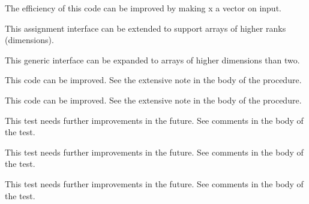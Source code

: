 \begin{DoxyRefList}
%
 The efficiency of this code can be improved by making {\ttfamily x} a vector on input. 
\item[(=) Type \mbox{\hyperlink{interfaceString__mod_1_1assignment_07_0a_08}{String\+\_\+mod\+::assignment(=)}} ]\label{todo__todo000058}%
%
 This assignment interface can be extended to support arrays of higher ranks (dimensions). 
\item[Type \mbox{\hyperlink{interfaceString__mod_1_1val2char}{String\+\_\+mod\+::val2char}} ]\label{todo__todo000057}%
%
 This generic interface can be expanded to arrays of higher dimensions than two. 
\item[Subprogram \mbox{\hyperlink{namespaceSystem__mod_a8f999de90840ba33f9cf7f30edd41b3d}{System\+\_\+mod\+::copy\+File}} (path\+Old, path\+New, is\+Unix\+Shell, Err)]\label{todo__todo000060}%
%
 This code can be improved. See the extensive note in the body of the procedure.  
\item[Subprogram \mbox{\hyperlink{namespaceSystem__mod_acdbe0231b40135bc08ab285fc69f2b80}{System\+\_\+mod\+::get\+System\+Info}} (List, Err, OS, count, cache\+File)]\label{todo__todo000059}%
%
 This code can be improved. See the extensive note in the body of the procedure.  
\item[Subprogram \mbox{\hyperlink{namespaceTest__System__mod_a56a58918b2888e7ea0fa691de93cdeb3}{Test\+\_\+\+System\+\_\+mod\+::test\+\_\+\+Cmd\+Arg\+\_\+type\+\_\+1}} ()]\label{todo__todo000067}%
%
 This test needs further improvements in the future. See comments in the body of the test.  
\item[Subprogram \mbox{\hyperlink{namespaceTest__System__mod_a43fd8159ffe52170057e95d4e0c38d63}{Test\+\_\+\+System\+\_\+mod\+::test\+\_\+\+Env\+Var\+\_\+type\+\_\+1}} ()]\label{todo__todo000064}%
%
 This test needs further improvements in the future. See comments in the body of the test.  
\item[Subprogram \mbox{\hyperlink{namespaceTest__System__mod_ab0121f340538dae91c97cc5cdcba0a7b}{Test\+\_\+\+System\+\_\+mod\+::test\+\_\+\+Env\+Var\+\_\+type\+\_\+2}} ()]\label{todo__todo000065}%
%
 This test needs further improvements in the future. See comments in the body of the test.  
\item[Subprogram \mbox{\hyperlink{namespaceTest__System__mod_a26054fb4e3bf2d05710adc7965bc8431}{Test\+\_\+\+System\+\_\+mod\+::test\+\_\+\+Env\+Var\+\_\+type\+\_\+3}} ()]\label{todo__todo000066}%

\end{DoxyRefList}
